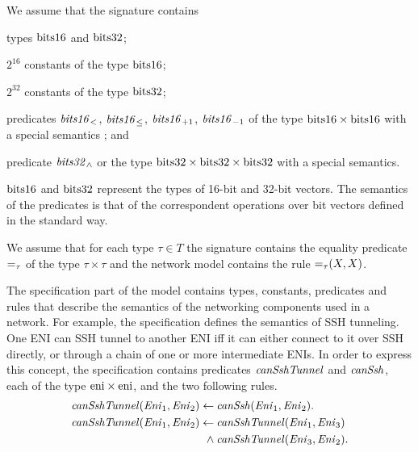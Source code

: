 We assume that the signature contains
\begin{enumerate*}[label=(\roman*)]
  \item types $\mathrm{bits16}$ and $\mathrm{bits32}$;
  \item $2^{16}$ constants of the type $\mathrm{bits16}$;
  \item $2^{32}$ constants of the type $\mathrm{bits32}$;
  \item predicates $\mathit{bits16}_<$, $\mathit{bits16}_\le$, $\mathit{bits16}_{+1}$, $\mathit{bits16}_{-1}$ of the type $\mathrm{bits16} \times \mathrm{bits16}$ with a special semantics ; and
  \item predicate $\mathit{bits32}_\wedge$ or the type $\mathrm{bits32}\times\mathrm{bits32}\times\mathrm{bits32}$ with a special semantics.
\end{enumerate*}
$\mathrm{bits16}$ and $\mathrm{bits32}$ represent the types of 16-bit and 32-bit vectors. The semantics of the predicates is that of the correspondent operations over bit vectors defined in the standard way.

We assume that for each type $\tau\in T$ the signature contains the equality predicate $\mathit{=}_\tau$ of the type $\tau\times\tau$ and the network model contains the rule $\mathit{=}_\tau(X,X)$.

The specification part of the model contains types, constants, predicates and rules that describe the semantics of the networking components used in a network. For example, the specification defines the semantics of SSH tunneling. One ENI can SSH tunnel to another ENI iff it can either connect to it over SSH directly, or through a chain of one or more intermediate ENIs. In order to express this concept, the specification contains predicates $\mathit{canSshTunnel}$ and $\mathit{canSsh}$, each of the type $\mathrm{eni}\times\mathrm{eni}$, and the two following rules.
\begin{align*}
\mathit{canSshTunnel}(\mathit{Eni}_1,\mathit{Eni}_2)\leftarrow\:&\mathit{canSsh}(\mathit{Eni}_1,\mathit{Eni}_2). \\
\mathit{canSshTunnel}(\mathit{Eni}_1,\mathit{Eni}_2)\leftarrow\:&\mathit{canSshTunnel}(\mathit{Eni}_1,\mathit{Eni}_3)\\
\wedge\:&\mathit{canSshTunnel}(\mathit{Eni}_3,\mathit{Eni}_2).
\end{align*}

